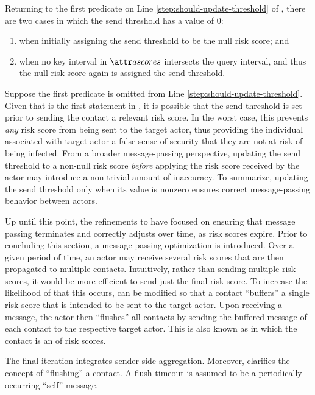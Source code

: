 Returning to the first predicate on Line \ref{step:should-update-threshold} of \cUpdateSendThreshold{}, there are two cases in which the send threshold has a value of 0:
\begin{enumerate}
  \item when initially assigning the send threshold to be the null risk score; and
  \item when no key interval in $\aActorScores$ intersects the query interval, and thus the null risk score again is assigned the send threshold.
\end{enumerate}

Suppose the first predicate is omitted from Line \ref{step:should-update-threshold}. Given that \cUpdateSendThreshold{} is the first statement in \cApplyRiskScore{}, it is possible that the send threshold is set prior to sending the contact a relevant risk score. In the worst case, this prevents \emph{any} risk score from being sent to the target actor, thus providing the individual associated with target actor a false sense of security that they are not at risk of being infected. From a broader message-passing perspective, updating the send threshold to a non-null risk score \emph{before} applying the risk score received by the actor may introduce a non-trivial amount of inaccuracy. To summarize, updating the send threshold only when its value is nonzero ensures correct message-passing behavior between actors.

Up until this point, the refinements to \cApplyRiskScore{} have focused on ensuring that message passing terminates and correctly adjusts over time, as risk scores expire. Prior to concluding this section, a message-passing optimization is introduced. Over a given period of time, an actor may receive several risk scores that are then propagated to multiple contacts. Intuitively, rather than sending multiple risk scores, it would be more efficient to send just the final risk score. To increase the likelihood of that this occurs, \cApplyRiskScore{} can be modified so that a contact ``buffers'' a single risk score that is intended to be sent to the target actor. Upon receiving a  message, the actor then ``flushes'' all contacts by sending the buffered message of each contact to the respective target actor. This is also known as  in which the contact is an  of risk scores. 

The final iteration \cApplyRiskScore{} integrates sender-side aggregation. Moreover, \cHandleFlushTimeout{} clarifies the concept of ``flushing'' a contact. A flush timeout is assumed to be a periodically occurring ``self'' message.

